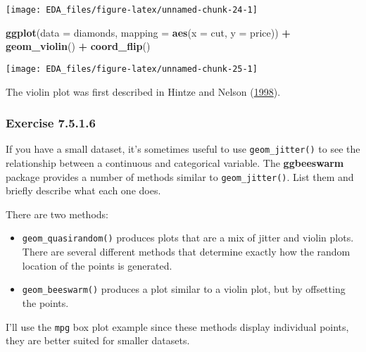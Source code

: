 \documentclass[]{book}
\newenvironment{Shaded}{\begin{snugshade}}{\end{snugshade}}
\newcommand{\DataTypeTok}[1]{\textcolor[rgb]{0.13,0.29,0.53}{#1}}
\newcommand{\KeywordTok}[1]{\textcolor[rgb]{0.13,0.29,0.53}{\textbf{#1}}}
\newcommand{\NormalTok}[1]{#1}
\newcommand{\OperatorTok}[1]{\textcolor[rgb]{0.81,0.36,0.00}{\textbf{#1}}}
\newcommand{\StringTok}[1]{\textcolor[rgb]{0.31,0.60,0.02}{#1}}
\providecommand{\tightlist}{%
  \setlength{\itemsep}{0pt}\setlength{\parskip}{0pt}}
\theoremstyle{plain}
\theoremstyle{remark}
\begin{document}
\begin{center}\texttt{[image: EDA\_files/figure-latex/unnamed-chunk-24-1]} \end{center}

\begin{Shaded}
\begin{Highlighting}[]
\KeywordTok{ggplot}\NormalTok{(}\DataTypeTok{data =}\NormalTok{ diamonds, }\DataTypeTok{mapping =} \KeywordTok{aes}\NormalTok{(}\DataTypeTok{x =}\NormalTok{ cut, }\DataTypeTok{y =}\NormalTok{ price)) }\OperatorTok{+}
\StringTok{  }\KeywordTok{geom_violin}\NormalTok{() }\OperatorTok{+}
\StringTok{  }\KeywordTok{coord_flip}\NormalTok{()}
\end{Highlighting}
\end{Shaded}

\begin{center}\texttt{[image: EDA\_files/figure-latex/unnamed-chunk-25-1]} \end{center}

The violin plot was first described in Hintze and Nelson
(\protect\hyperlink{ref-HintzeNelson1998}{1998}).

\hypertarget{exercise-7.5.1.6}{%
\subsubsection*{\texorpdfstring{Exercise
{7.5.1.6}}{Exercise 7.5.1.6}}\label{exercise-7.5.1.6}}

If you have a small dataset, it's sometimes useful to use
\texttt{geom\_jitter()} to see the relationship between a continuous and
categorical variable. The \textbf{ggbeeswarm} package provides a number
of methods similar to \texttt{geom\_jitter()}. List them and briefly
describe what each one does.

There are two methods:

\begin{itemize}
\tightlist
\item
  \texttt{geom\_quasirandom()} produces plots that are a mix of jitter
  and violin plots. There are several different methods that determine
  exactly how the random location of the points is generated.
\item
  \texttt{geom\_beeswarm()} produces a plot similar to a violin plot,
  but by offsetting the points.
\end{itemize}

I'll use the \texttt{mpg} box plot example since these methods display
individual points, they are better suited for smaller datasets.
\end{document}
